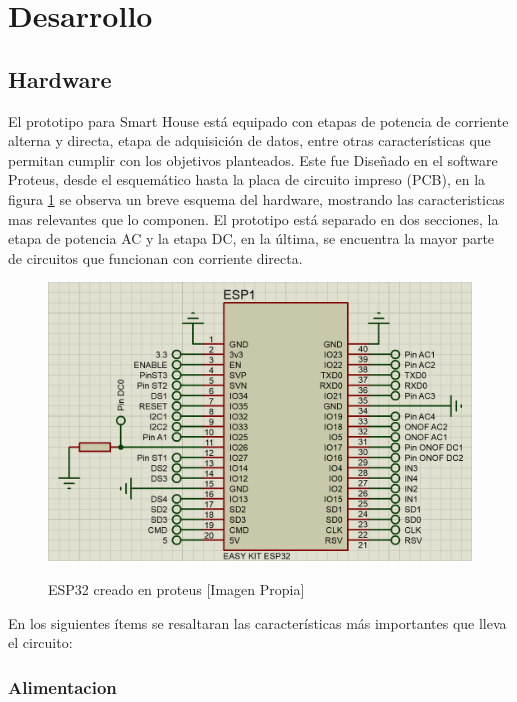 \section{Desarrollo}
\subsection{Hardware}\label{sec:hw}

El prototipo para Smart House está equipado con etapas de potencia de corriente alterna y directa, etapa de adquisición de datos, entre otras características que permitan cumplir con los objetivos planteados. Este fue Diseñado en el software Proteus, desde el esquemático hasta la placa de circuito impreso (PCB), en la figura \ref{fig:esp32} se observa un breve esquema del hardware, mostrando las caracteristicas mas relevantes que lo componen. El prototipo está separado en dos secciones, la etapa de potencia AC y la etapa DC, en la última, se encuentra la mayor parte de circuitos que funcionan con corriente directa.\\

\begin{figure}[!t]
	\centering
	\caption{ESP32 creado en proteus [Imagen Propia]}
	\includegraphics[width=0.9\linewidth]{Imagenes/ESP32}	
	\label{fig:esp32}
\end{figure}

En los siguientes ítems se resaltaran las características más importantes que lleva el circuito:\\

	\subsubsection{Alimentacion}
	

